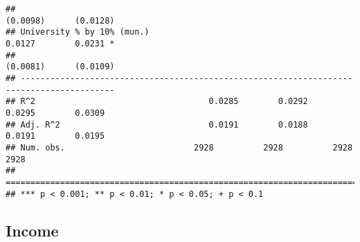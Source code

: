 \documentclass[
]{article}
\begin{document}
\begin{verbatim}
##                                                                  (0.0098)      (0.0128)  
## University % by 10% (mun.)                                        0.0127        0.0231 * 
##                                                                  (0.0081)      (0.0109)  
## -----------------------------------------------------------------------------------------
## R^2                                   0.0285        0.0292        0.0295        0.0309   
## Adj. R^2                              0.0191        0.0188        0.0191        0.0195   
## Num. obs.                          2928          2928          2928          2928        
## =========================================================================================
## *** p < 0.001; ** p < 0.01; * p < 0.05; + p < 0.1
\end{verbatim}

\hypertarget{income-3}{%
\subsection{Income}\label{income-3}}
\end{document}
